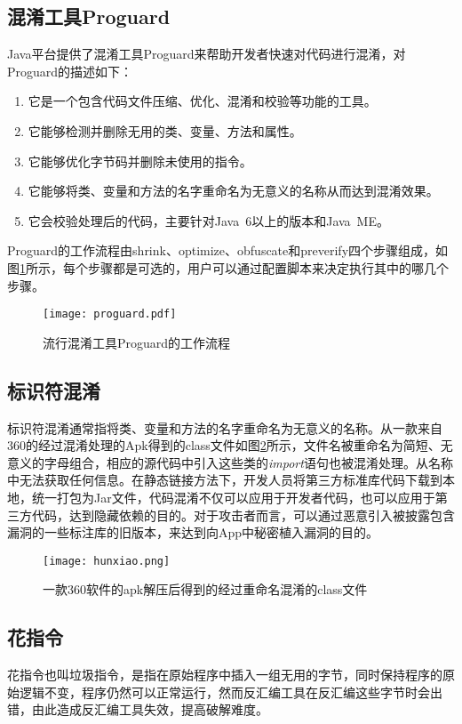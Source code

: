 \subsection{混淆工具Proguard}
Java平台提供了混淆工具Proguard\cite{proguard}来帮助开发者快速对代码进行混淆，对Proguard的描述如下：
\begin{enumerate}
\item{它是一个包含代码文件压缩、优化、混淆和校验等功能的工具。}
\item{它能够检测并删除无用的类、变量、方法和属性。}
\item{它能够优化字节码并删除未使用的指令。}
\item{它能够将类、变量和方法的名字重命名为无意义的名称从而达到混淆效果。}
\item{它会校验处理后的代码，主要针对Java\ 6以上的版本和Java\ ME。}
\end{enumerate}

Proguard的工作流程由shrink、optimize、obfuscate和preverify四个步骤组成，如图\ref{fig:proguard}所示，每个步骤都是可选的，用户可以通过配置脚本来决定执行其中的哪几个步骤。

\begin{figure}[!htp]
  \centering
  \texttt{[image: proguard.pdf]} \\
  \caption{流行混淆工具Proguard的工作流程}
 \label{fig:proguard}
\end{figure}


\subsection{标识符混淆}
标识符混淆通常指将类、变量和方法的名字重命名为无意义的名称。从一款来自360的经过混淆处理的Apk得到的class文件如图\ref{fig:hunxiao}所示，文件名被重命名为简短、无意义的字母组合，相应的源代码中引入这些类的\textit{import}语句也被混淆处理。从名称中无法获取任何信息。在静态链接方法下，开发人员将第三方标准库代码下载到本地，统一打包为Jar文件，代码混淆不仅可以应用于开发者代码，也可以应用于第三方代码，达到隐藏依赖的目的。对于攻击者而言，可以通过恶意引入被披露包含漏洞的一些标注库的旧版本，来达到向App中秘密植入漏洞的目的。

\begin{figure}[!htp]
  \centering
  \texttt{[image: hunxiao.png]} \\
  \caption{一款360软件的apk解压后得到的经过重命名混淆的class文件}
 \label{fig:hunxiao}
\end{figure}

\subsection{花指令}
花指令也叫垃圾指令，是指在原始程序中插入一组无用的字节，同时保持程序的原始逻辑不变，程序仍然可以正常运行，然而反汇编工具在反汇编这些字节时会出错，由此造成反汇编工具失效，提高破解难度。

